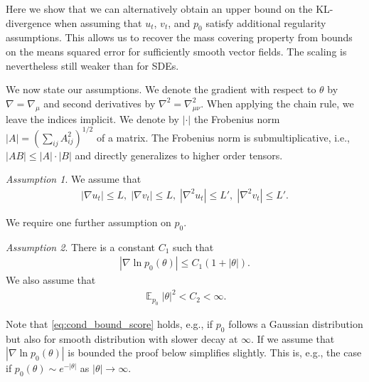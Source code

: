 \documentclass{article}
\theoremstyle{remark}
\newtheorem{assumption}{Assumption}
\DeclareMathOperator{\Ex}{\ensuremath{\mathbb{E}}}
\begin{document}
Here we show that we can alternatively obtain an upper bound on the KL-divergence
when assuming that $u_t$, $v_t$,
and $p_0$ satisfy additional regularity assumptions.
This allows us to recover the mass covering property from bounds on the means squared error for sufficiently smooth vector fields. The scaling is nevertheless still weaker than for SDEs.

 We now state our assumptions.
 We denote the gradient with respect to $\theta$  by $\nabla = \nabla_\mu$ and second derivatives by $\nabla^2=\nabla^2_{\mu\nu}$. When applying the chain rule, we leave the indices implicit.
 We denote by $|\cdot|$ the Frobenius norm $|A|=\left(\sum_{ij} A_{ij}^2\right)^{1/2}$ of a matrix. The Frobenius norm is submultiplicative, i.e., $|AB|\leq |A|\cdot |B|$
 and directly generalizes to higher order tensors.
\begin{assumption}\label{as:1}
We assume that
\begin{align}
    |\nabla u_t |\leq L, \; |\nabla  v_t|\leq L, \;
    |\nabla ^2 u_t|\leq L',\;
    |\nabla ^2 v_t|\leq L'.
\end{align}
\end{assumption}
We require one further assumption on $p_0$.
\begin{assumption}\label{as:2}
There is a constant $C_1$ such that
\begin{align}\label{eq:cond_bound_score}
   | \nabla \ln p_0(\theta)|\leq  C_1(1 + |\theta|).
\end{align}
We also assume that 
\begin{align}\label{eq:cond_square_integrable}
    \Ex_{p_0} |\theta|^2 <C_2< \infty.
\end{align}
\end{assumption}
Note that \eqref{eq:cond_bound_score} holds, e.g., if $p_0$ follows a Gaussian distribution but also for smooth distribution with slower decay at $\infty$.
If we assume that $| \nabla \ln p_0(\theta)|$ is bounded the 
proof below simplifies slightly. This is, e.g., the
case if $p_0(\theta)\sim e^{-|\theta|}$ as $|\theta|\to \infty$.
\end{document}
